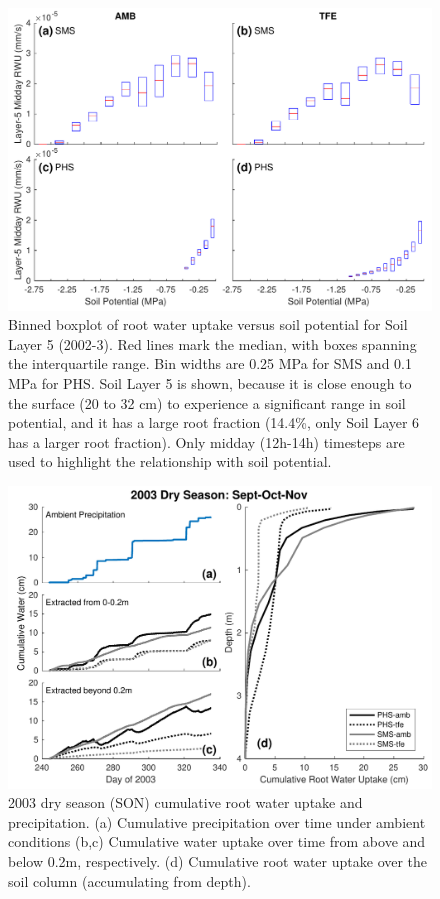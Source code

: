 \documentclass[draft,linenumbers]{agujournal}
\begin{document}
  \begin{figure}[h]
     \centering
     \includegraphics[width=30pc]{../figs3/rwu.pdf}
     \caption{Binned boxplot of root water uptake versus soil potential for Soil Layer 5 (2002-3).
     Red lines mark the median, with boxes spanning the interquartile range.
     Bin widths are 0.25 MPa for SMS and 0.1 MPa for PHS.
     Soil Layer 5 is shown, because it is close enough to the surface (20 to 32 cm) to experience a significant range in soil potential, and it has a large root fraction (14.4\%, only Soil Layer 6 has a larger root fraction).
     Only midday (12h-14h) timesteps are used to highlight the relationship with soil potential.}
     \label{fig:rwu}
  \end{figure}
  \clearpage

        \clearpage
    \begin{figure}[h]
     \centering
     \includegraphics[width=30pc]{../figs3/qdry.pdf}
     \caption{2003 dry season (SON) cumulative root water uptake and precipitation. 
     (a) Cumulative precipitation over time under ambient conditions
     (b,c) Cumulative water uptake over time from above and below 0.2m, respectively.
     (d) Cumulative root water uptake over the soil column (accumulating from depth).
     }
     \label{fig:qdry}
  \end{figure}
  
\end{document}
